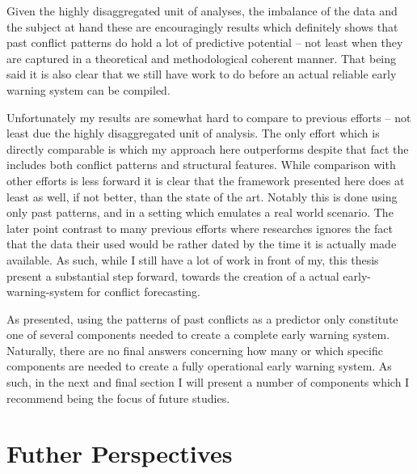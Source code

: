 \documentclass[a4paper]{article}
\begin{document}
Given the highly disaggregated unit of analyses, the imbalance of the data and the subject at hand these are encouragingly results which definitely shows that past conflict patterns do hold a lot of predictive potential -- not least when they are captured in a theoretical and methodological coherent manner. That being said it is also clear that we still have work to do before an actual reliable early warning system can be compiled.\par 

Unfortunately my results are somewhat hard to compare to previous efforts -- not least due the highly disaggregated unit of analysis. The only effort which is directly comparable is \cite{Maase} which my approach here outperforms despite that fact the \cite{Maase} includes both conflict patterns and structural features. While comparison with other efforts is less forward it is clear that the framework presented here does at least as well, if not better, than the state of the art. Notably this is done using only past patterns, and in a setting which emulates a real world scenario. The later point contrast to many previous efforts where researches ignores the fact that the data their used would be rather dated by the time it is actually made available. As such, while I still have a lot of work in front of my, this thesis present a substantial step forward, towards the creation of a actual early-warning-system for conflict forecasting.\par

As presented, using the patterns of past conflicts as a predictor only constitute one of several components needed to create a complete early warning system. Naturally, there are no final answers concerning how many or which specific components are needed to create a fully operational early warning system. As such, in the next and final section I will present a number of components which I recommend being the focus of future studies.\par

\section{Futher Perspectives}
\end{document}
